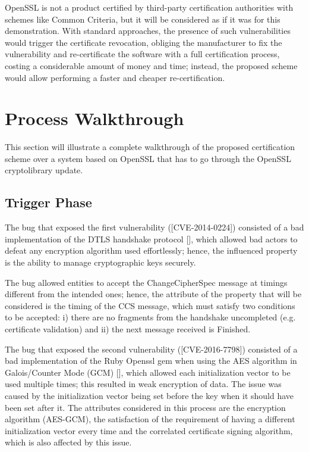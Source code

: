 OpenSSL is not a product certified by third-party certification authorities with schemes like Common Criteria, but it will be considered as if it was for this demonstration. With standard approaches, the presence of such vulnerabilities would trigger the certificate revocation, obliging the manufacturer to fix the vulnerability and re-certificate the software with a full certification process, costing a considerable amount of money and time; instead, the proposed scheme would allow performing a faster and cheaper re-certification.

\section{Process Walkthrough}
This section will illustrate a complete walkthrough of the proposed certification scheme over a system based on OpenSSL that has to go through the OpenSSL cryptolibrary update.

\subsection{Trigger Phase}
The bug that exposed the first vulnerability ([CVE-2014-0224]) consisted of a bad implementation of the DTLS handshake protocol [], which allowed bad actors to defeat any encryption algorithm used effortlessly; hence, the influenced property is the ability to manage cryptographic keys securely.

The bug allowed entities to accept the ChangeCipherSpec message at timings different from the intended ones; hence, the attribute of the property that will be considered is the timing of the CCS message, which must satisfy two conditions to be accepted: i) there are no fragments from the handshake uncompleted (e.g. certificate validation) and ii) the next message received is Finished.

The bug that exposed the second vulnerability ([CVE-2016-7798]) consisted of a bad implementation of the Ruby Openssl gem when using the AES algorithm in Galois/Counter Mode (GCM) [], which allowed each initialization vector to be used multiple times; this resulted in weak encryption of data. The issue was caused by the initialization vector being set before the key when it should have been set after it. The attributes considered in this process are the encryption algorithm (AES-GCM), the satisfaction of the requirement of having a different initialization vector every time and the correlated certificate signing algorithm, which is also affected by this issue.

